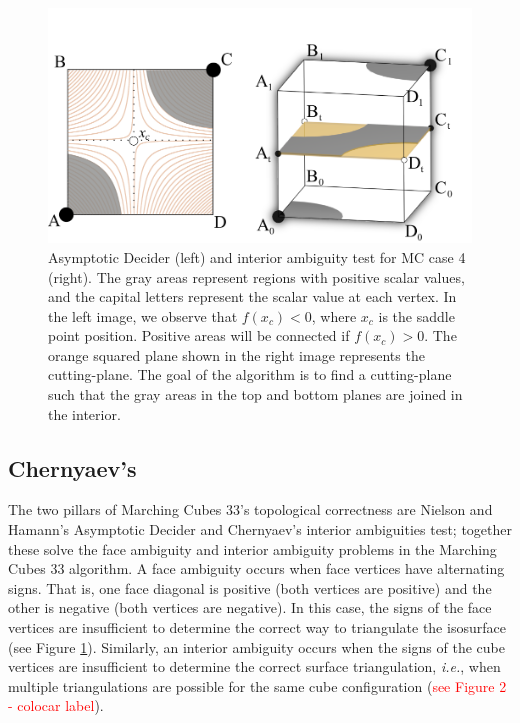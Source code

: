 \begin{figure}
     \centering
     \includegraphics[width=0.95\linewidth]{chapter4/figures/cut-plane-fig.png}
     \caption{Asymptotic Decider (left) and \mc{} interior ambiguity test for MC case 4 (right). The gray areas represent regions with positive scalar values, and the capital letters represent the scalar value at each vertex. In the left image, we observe that $f(x_c) < 0$, where $x_c$ is the saddle point position. Positive areas will be connected if $f(x_c) > 0$. The orange squared plane shown in the right image represents the cutting-plane. The goal of the \mc{} algorithm is to find a cutting-plane such that the gray areas in the top and bottom planes are joined in the interior.}
     \label{interior_ambiguity}
\end{figure}

\subsection{Chernyaev's \mc{}}

The two pillars of Marching Cubes 33's topological correctness are Nielson and Hamann's Asymptotic Decider and Chernyaev's interior ambiguities test; together these solve the face ambiguity and interior ambiguity problems in the Marching Cubes 33 algorithm.
%
%
%
A face ambiguity occurs when face vertices have alternating signs. That is, one face diagonal is positive (both vertices are positive) and the other is negative (both vertices are negative). In this case, the signs of the face vertices are insufficient to determine the correct way to triangulate the isosurface (see Figure \ref{interior_ambiguity}). Similarly, an interior ambiguity occurs when the signs of the cube vertices are insufficient to determine the correct surface triangulation, \emph{i.e.}, when multiple triangulations are possible for the same cube configuration (\textcolor{red}{see Figure 2 - colocar label}).

